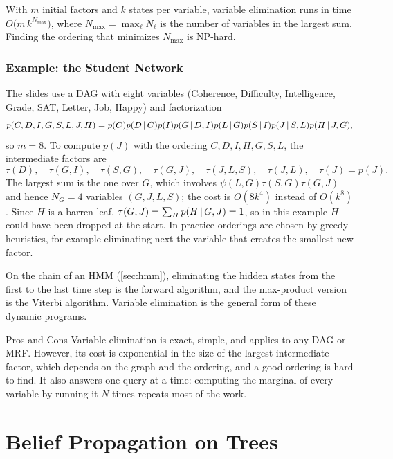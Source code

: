 \begin{proposition}\label{prop:ve-cost}
With $m$ initial factors and $k$ states per variable, variable elimination runs in time $O\big(m\,k^{N_{\max}}\big)$, where $N_{\max}=\max_\ell N_\ell$ is the number of variables in the largest sum. Finding the ordering that minimizes $N_{\max}$ is NP-hard.
\end{proposition}

\subsubsection{Example: the Student Network}

The slides use a DAG with eight variables (Coherence, Difficulty, Intelligence, Grade, SAT, Letter, Job, Happy) and factorization
\[
p(C,D,I,G,S,L,J,H)=p(C)p(D\,|\, C)p(I)p(G\,|\, D,I)p(L\,|\, G)p(S\,|\, I)p(J\,|\, S,L)p(H\,|\, J,G),
\]
so $m=8$. To compute $p(J)$ with the ordering $C,D,I,H,G,S,L$, the intermediate factors are
\[
\tau(D),\quad\tau(G,I),\quad\tau(S,G),\quad\tau(G,J),\quad\tau(J,L,S),\quad\tau(J,L),\quad\tau(J)=p(J).
\]
The largest sum is the one over $G$, which involves $\psi(L,G)\tau(S,G)\tau(G,J)$ and hence $N_G=4$ variables $(G,J,L,S)$; the cost is $O(8k^4)$ instead of $O(k^8)$. Since $H$ is a barren leaf, $\tau(G,J)=\sum_Hp(H\,|\, G,J)=1$, so in this example $H$ could have been dropped at the start. In practice orderings are chosen by greedy heuristics, for example eliminating next the variable that creates the smallest new factor.

\begin{remark}
On the chain of an HMM (\cref{sec:hmm}), eliminating the hidden states from the first to the last time step is the forward algorithm, and the max-product version is the Viterbi algorithm. Variable elimination is the general form of these dynamic programs.
\end{remark}

\begin{notebox}{Pros and Cons}
Variable elimination is exact, simple, and applies to any DAG or MRF. However, its cost is exponential in the size of the largest intermediate factor, which depends on the graph and the ordering, and a good ordering is hard to find. It also answers one query at a time: computing the marginal of every variable by running it $N$ times repeats most of the work.
\end{notebox}

\section{Belief Propagation on Trees}\label{sec:bp}

